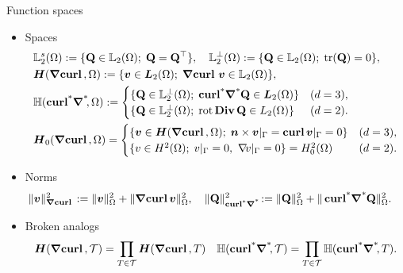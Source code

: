 \documentclass[10pt]{beamer}
\begin{document}
\begin{frame}{Function spaces}
\begin{itemize}
\item Spaces
\begin{align*}
    &\LL_2^s(\Omega):=\{\QQ\in\LL_2(\Omega);\; \QQ=\QQ^\top\},\quad
   \LL_2^\perp(\Omega):=\{\QQ\in\LL_2(\Omega);\; \mathrm{tr}(\QQ)=0\}, \\
    &\HGradCurl{\Omega}:=\{\bv\in\bL_2(\Omega);\; \GCurl\bv\in\LL_2(\Omega)\},\\
    &\HGradCurla{\Omega}:=
   \begin{cases} \{\QQ\in\LL_2^\perp(\Omega);\; \GCurla\QQ\in\bL_2(\Omega)\} & (\di=3),\\
                 \{\QQ\in\LL_2^\perp(\Omega);\; \rot\Div\QQ\in L_2(\Omega)\} & (\di=2).
   \end{cases} \\
   &\HGradCurlz{\Omega} =
   \begin{cases}
      \{\bv\in \HGradCurl{\Omega};\; \nn\times\bv|_{\Gamma}=\Curl\bv|_{\Gamma} = 0\} & (\di=3),\\
      \{v\in H^2(\Omega);\; v|_{\Gamma}=0,\ \grad\!v|_{\Gamma}=0\} = H^2_0(\Omega)   & (\di=2).
   \end{cases}
\end{align*}  
\item Norms 
\begin{align*}
        &\|\bv\|^2_{\Grad\Curl} := \|\bv\|_{\Omega}^2+\|\Grad\Curl \bv\|_{\Omega}^2, \quad
        \|\QQ\|^2_{\GCurla} :=\|\QQ\|_{\Omega}^2+\|\GCurla \QQ\|_{\Omega}^2.
\end{align*}
\item Broken analogs
\begin{align*}
    \HGradCurl{\cT} = \prod_{T \in \cT} \HGradCurl{T} \quad \HGradCurla{\cT} = \prod_{T \in \cT} \HGradCurla{T}.
\end{align*}
\end{itemize}
\end{frame}
\end{document}
